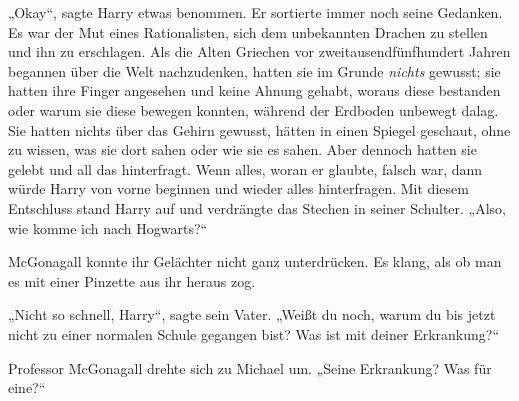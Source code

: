 „Okay“, sagte Harry etwas benommen. Er sortierte immer noch seine Gedanken. Es war der Mut eines Rationalisten, sich dem unbekannten Drachen zu stellen und ihn zu erschlagen. Als die Alten Griechen vor zweitausendfünfhundert Jahren begannen über die Welt nachzudenken, hatten sie im Grunde \emph{nichts} gewusst; sie hatten ihre Finger angesehen und keine Ahnung gehabt, woraus diese bestanden oder warum sie diese bewegen konnten, während der Erdboden unbewegt dalag. Sie hatten nichts über das Gehirn gewusst, hätten in einen Spiegel geschaut, ohne zu wissen, was sie dort sahen oder wie sie es sahen. Aber dennoch hatten sie gelebt und all das hinterfragt. Wenn alles, woran er glaubte, falsch war, dann würde Harry von vorne beginnen und wieder alles hinterfragen. Mit diesem Entschluss stand Harry auf und verdrängte das Stechen in seiner Schulter.
„Also, wie komme ich nach Hogwarts?“

McGonagall konnte ihr Gelächter nicht ganz unterdrücken. Es klang, als ob man es mit einer Pinzette aus ihr heraus zog.


„Nicht so schnell, Harry“, sagte sein Vater.
„Weißt du noch, warum du bis jetzt nicht zu einer normalen Schule gegangen bist? Was ist mit deiner Erkrankung?“

Professor McGonagall drehte sich zu Michael um.
„Seine Erkrankung? Was für eine?“

